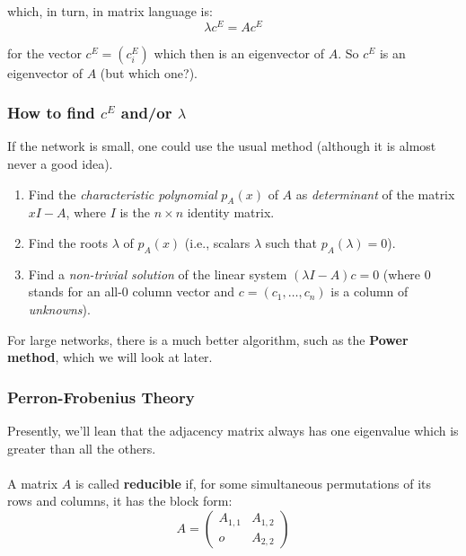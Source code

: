 \documentclass[a4paper,11pt]{article}
\begin{document}
which, in turn, in matrix language is:
\[
    \lambda c^E = Ac^E
\]

for the vector $c^E = (c_i^E)$ which then is an eigenvector of $A$.
So $c^E$ is an eigenvector of $A$ (but which one?).

\subsubsection{How to find $c^E$ and/or $\lambda$}
If the network is small, one could use the usual method (although it is almost never a good idea).
\begin{enumerate}
    \item   Find the \textit{characteristic polynomial} $p_A(x)$ of $A$ as \textit{determinant} of the matrix $xI -A$, where $I$ is the $n \times n$ identity matrix.
    \item   Find the roots $\lambda$ of $p_A(x)$ (i.e., scalars $\lambda$ such that $p_A(\lambda) = 0$).
    \item   Find a \textit{non-trivial solution} of the linear system $(\lambda I - A) c = 0$ (where $0$ stands for an all-$0$ column vector and $c = (c_1, \dots, c_n)$ is a column of \textit{unknowns}).
\end{enumerate}

For large networks, there is a much better algorithm, such as the \textbf{Power method}, which we will look at later.

\subsubsection{Perron-Frobenius Theory}
Presently, we'll lean that the adjacency matrix always has one eigenvalue which is greater than all the others.
\\\\
A matrix $A$ is called \textbf{reducible} if, for some simultaneous permutations of its rows and columns, it has the block form:
\[
    A =
    \begin{pmatrix}
        A_{1,1} & A_{1,2} \\
        o & A_{2,2}
    \end{pmatrix}
\]
\end{document}
